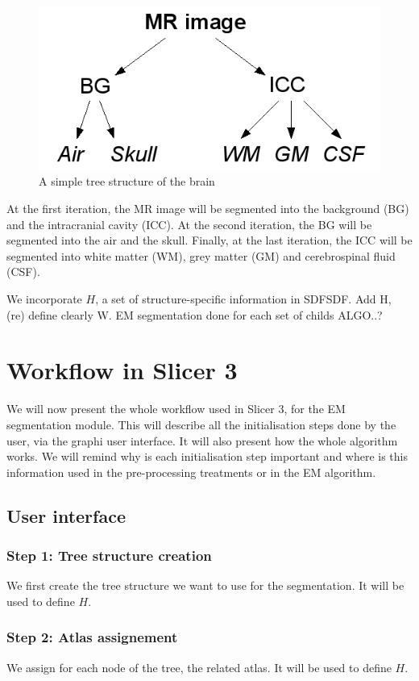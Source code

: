   
  \begin{figure}[ht]\centering
  \includegraphics[width=.5\textwidth]{Images/Graphics/treeStructure.png}
  \caption{A simple tree structure of the brain}\label{fig:treeStructure}
  \end{figure}
  
At the first iteration, the MR image will be segmented into the background (BG) and the intracranial cavity (ICC). At the second iteration, the BG will be segmented into the air and the skull. Finally, at the last iteration, the ICC will be segmented into white matter (WM), grey matter (GM) and cerebrospinal fluid (CSF).

We incorporate $H$, a set of structure-specific information in SDFSDF.  Add H, (re) define clearly W. EM segmentation done for each set of childs
ALGO..?
%
\section{Workflow in Slicer 3}
We will now present the whole workflow used in Slicer 3, for the EM segmentation module. This will describe all the initialisation steps done by the user, via the graphi user interface. It will also present how the whole algorithm works. We will remind why is each initialisation step important and where is this information used in the pre-processing treatments or in the EM algorithm.
%
\subsection{User interface}
\subsubsection{Step 1: Tree structure creation}
We first create the tree structure we want to use for the segmentation. It will be used to define $H$.
%
\subsubsection{Step 2: Atlas assignement}
We assign for each node of the tree, the related atlas. It will be used to define $H$.
%
